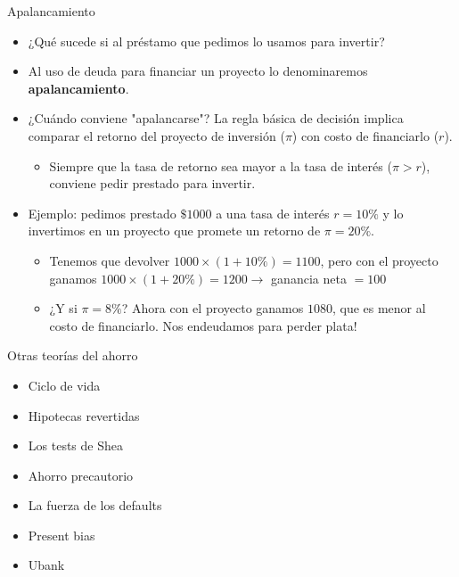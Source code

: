 \documentclass{beamer}
\begin{document}
\begin{frame}{Apalancamiento}
   \begin{itemize}
       \item ¿Qué sucede si al préstamo que pedimos lo usamos para invertir?
       \item Al uso de deuda para financiar un proyecto lo denominaremos \textbf{apalancamiento}.
       \item ¿Cuándo conviene "apalancarse"? La regla básica de decisión implica comparar el retorno del proyecto de inversión ($\pi$) con costo de financiarlo ($r$).
          \begin{itemize}
       \item \textcolor{blue!70!black}{Siempre que la tasa de retorno sea mayor a la tasa de interés ($\pi>r$), conviene pedir prestado para invertir.} 
          \end{itemize} 
       \item Ejemplo: pedimos prestado $\$1000$ a una tasa de interés $r=10\%$ y lo invertimos en un proyecto que promete un retorno de $\pi=20\%$.
          \begin{itemize}
        \item Tenemos que devolver $1000\times(1+10\%)=1100$, pero con el proyecto ganamos $1000\times(1+20\%)=1200\rightarrow$ ganancia neta $=100$  
       \item ¿Y si $\pi=8\%$? Ahora con el proyecto ganamos $1080$, que es menor al costo de financiarlo. Nos endeudamos para perder plata!
          \end{itemize} 
   \end{itemize} 
\end{frame}

\begin{frame}{Otras teorías del ahorro}
   \begin{itemize}
       \item Ciclo de vida
       \item Hipotecas revertidas
       \item Los tests de Shea
       \item Ahorro precautorio
       \item La fuerza de los defaults
       \item Present bias
       \item Ubank
   \end{itemize} 
\end{frame}
\end{document}
